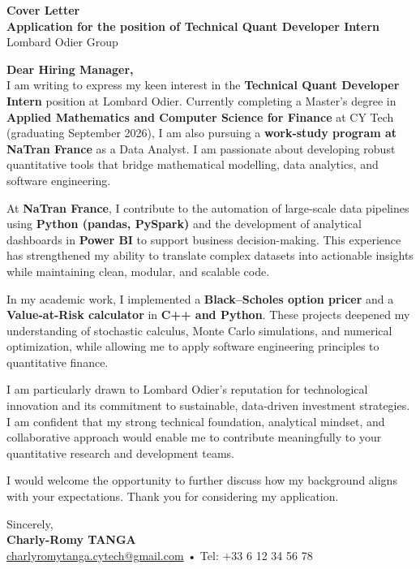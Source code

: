 \documentclass[a4paper,10pt]{article}
\begin{document}
\begin{center}
    {\LARGE \textbf{Cover Letter}}\\[8pt]
    \textbf{Application for the position of Technical Quant Developer Intern}\\[4pt]
    Lombard Odier Group
\end{center}

\vspace{0.6cm}

\noindent
\textbf{Dear Hiring Manager,}\\[6pt]

I am writing to express my keen interest in the \textbf{Technical Quant Developer Intern} position at Lombard Odier.  
Currently completing a Master’s degree in \textbf{Applied Mathematics and Computer Science for Finance} at CY Tech (graduating September 2026), I am also pursuing a \textbf{work-study program at NaTran France} as a Data Analyst.  
I am passionate about developing robust quantitative tools that bridge mathematical modelling, data analytics, and software engineering.

At \textbf{NaTran France}, I contribute to the automation of large-scale data pipelines using \textbf{Python (pandas, PySpark)} and the development of analytical dashboards in \textbf{Power BI} to support business decision-making.  
This experience has strengthened my ability to translate complex datasets into actionable insights while maintaining clean, modular, and scalable code.

In my academic work, I implemented a \textbf{Black–Scholes option pricer} and a \textbf{Value-at-Risk calculator} in \textbf{C++ and Python}.  
These projects deepened my understanding of stochastic calculus, Monte Carlo simulations, and numerical optimization, while allowing me to apply software engineering principles to quantitative finance.

I am particularly drawn to Lombard Odier’s reputation for technological innovation and its commitment to sustainable, data-driven investment strategies.  
I am confident that my strong technical foundation, analytical mindset, and collaborative approach would enable me to contribute meaningfully to your quantitative research and development teams.

I would welcome the opportunity to further discuss how my background aligns with your expectations.  
Thank you for considering my application.

\vspace{1cm}

\noindent
Sincerely,\\[4pt]
\textbf{Charly-Romy TANGA}\\
\href{mailto:charlyromytanga.cytech@gmail.com}{charlyromytanga.cytech@gmail.com} • Tel: +33 6 12 34 56 78
\end{document}
